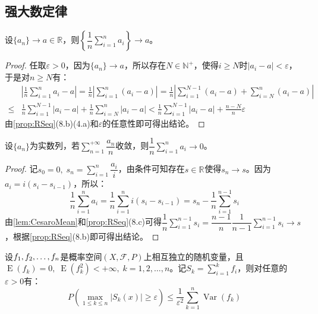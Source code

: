 \subsection{强大数定律}
\begin{lemma}[Cesàro平均]\label{lem:CesaroMean}
	设$\{a_n\}\to a\in\mathbb{R}$，则$\left\{\dfrac{1}{n}\sum\limits_{i=1}^{n}a_i\right\}\to a$。
\end{lemma}
\begin{proof}
	任取$\varepsilon>0$，因为$\{a_n\}\to a$，所以存在$N\in\mathbb{N}^+$，使得$i\geqslant N$时$|a_i-a|<\varepsilon$，于是对$n\geqslant N$有：
	\begin{align*}
		&\left|\frac{1}{n}\sum_{i=1}^{n}a_i-a\right|=\frac{1}{n}\left|\sum_{i=1}^{n}(a_i-a)\right|=\frac{1}{n}\left|\sum_{i=1}^{N-1}(a_i-a)+\sum_{i=N}^{n}(a_i-a)\right| \\
		\leqslant&\frac{1}{n}\sum_{i=1}^{N-1}|a_i-a|+\frac{1}{n}\sum_{i=N}^{n}|a_i-a|<\frac{1}{n}\sum_{i=1}^{N-1}|a_i-a|+\frac{n-N}{n}\varepsilon
	\end{align*}
	由\cref{prop:RSeq}(8.b)(4.a)和$\varepsilon$的任意性即可得出结论。
\end{proof}
\begin{lemma}\label{lem:KroneckerMean}
	设$\{a_n\}$为实数列，若$\sum\limits_{n=1}^{+\infty}\dfrac{a_n}{n}$收敛，则$\dfrac{1}{n}\sum\limits_{i=1}^{n}a_i\to0$。
\end{lemma}
\begin{proof}
	记$s_0=0,\;s_n=\sum\limits_{i=1}^{n}\dfrac{a_i}{i}$，由条件可知存在$s\in\mathbb{R}^{}$使得$s_n\to s$。因为$a_i=i(s_i-s_{i-1})$，所以：
	\begin{equation*}
		\frac{1}{n}\sum_{i=1}^{n}a_i=\frac{1}{n}\sum_{i=1}^{n}i(s_i-s_{i-1})=s_n-\frac{1}{n}\sum_{i=1}^{n-1}s_i
	\end{equation*}
	由\cref{lem:CesaroMean}和\cref{prop:RSeq}(8.c)可得$\dfrac{1}{n}\sum\limits_{i=1}^{n-1}s_i=\dfrac{n-1}{n}\dfrac{1}{n-1}\sum\limits_{i=1}^{n-1}s_i\to s$，根据\cref{prop:RSeq}(8.b)即可得出结论。
\end{proof}
\begin{lemma}[Kolmogorov最大不等式]\label{lem:KolmogorovMaximal}
	设$f_1, f_2, \dots, f_{n}$是概率空间$(X,\mathscr{F},P)$上相互独立的随机变量，且$\operatorname{E}(f_k)=0,\;\operatorname{E}(f_k^2)<+\infty,\;k=1,2,\dots,n$。记$S_k=\sum\limits_{i=1}^{k}f_i$，则对任意的$\varepsilon>0$有：
	\begin{equation*}
		P\left(\max_{1\leqslant k\leqslant n}|S_k(x)|\geqslant\varepsilon\right)\leqslant\frac{1}{\varepsilon^2}\sum_{k=1}^{n}\operatorname{Var}(f_k)
	\end{equation*}
\end{lemma}
